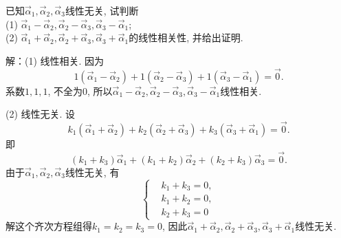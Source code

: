 \begin{eg}
已知$\vec{\alpha}_1,\vec{\alpha}_2,\vec{\alpha}_3$线性无关, 试判断\\
(1) $\vec{\alpha}_1-\vec{\alpha}_2, \vec{\alpha}_2-\vec{\alpha}_3,\vec{\alpha}_3-\vec{\alpha}_1$;\\
(2) $\vec{\alpha}_1+\vec{\alpha}_2, \vec{\alpha}_2+\vec{\alpha}_3,\vec{\alpha}_3+\vec{\alpha}_1$的线性相关性, 并给出证明.
\end{eg}
解：(1) 线性相关. 因为
$$1(\vec{\alpha}_1-\vec{\alpha}_2)+1( \vec{\alpha}_2-\vec{\alpha}_3)+1(\vec{\alpha}_3-\vec{\alpha}_1)=\vec{0}.$$
系数$1, 1, 1$, 不全为$0$, 所以$\vec{\alpha}_1-\vec{\alpha}_2, \vec{\alpha}_2-\vec{\alpha}_3,\vec{\alpha}_3-\vec{\alpha}_1$线性相关.

(2) 线性无关. 设
$$k_1(\vec{\alpha}_1+\vec{\alpha}_2)+k_2( \vec{\alpha}_2+\vec{\alpha}_3)+k_3(\vec{\alpha}_3+\vec{\alpha}_1)=\vec{0}.$$
即$$(k_1+k_3)\vec{\alpha}_1+(k_1+k_2)\vec{\alpha}_2+(k_2+k_3)\vec{\alpha}_3=\vec{0}.$$
由于$\vec{\alpha}_1,\vec{\alpha}_2,\vec{\alpha}_3$线性无关, 有
\begin{displaymath}\left\{\begin{aligned}&k_1+k_3=0,\\&k_1+k_2=0,\\&k_2+k_3=0\end{aligned}
\right.\end{displaymath}
解这个齐次方程组得$k_1=k_2=k_3=0$, 因此$\vec{\alpha}_1+\vec{\alpha}_2, \vec{\alpha}_2+\vec{\alpha}_3,\vec{\alpha}_3+\vec{\alpha}_1$线性无关.


